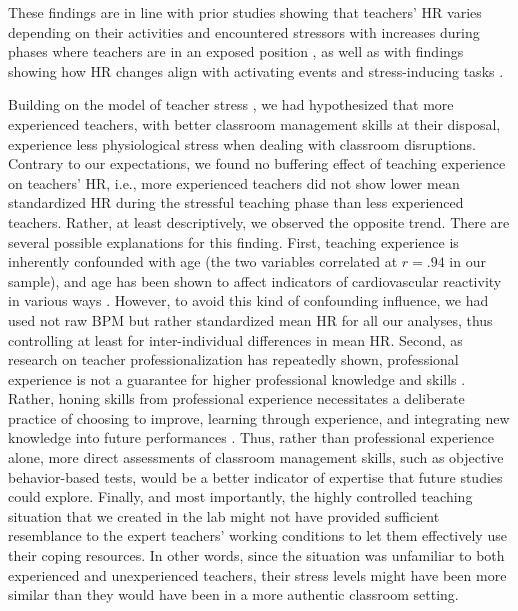 \documentclass[preprint, 3p,
authoryear]{elsarticle} %
\begin{document}
These findings are in line with prior studies showing that teachers' HR
varies depending on their activities and encountered stressors with
increases during phases where teachers are in an exposed position
\citep{sperka1995, scheuch1997psychophysische, donker2018, junker2021},
as well as with findings showing how HR changes align with activating
events and stress-inducing tasks \citep{Darnell2019, chalmers2021}.

Building on the model of teacher stress \citep[see Fig.
2]{kyriacou1978}, we had hypothesized that more experienced teachers,
with better classroom management skills at their disposal, experience
less physiological stress when dealing with classroom disruptions.
Contrary to our expectations, we found no buffering effect of teaching
experience on teachers' HR, i.e., more experienced teachers did not show
lower mean standardized HR during the stressful teaching phase than less
experienced teachers. Rather, at least descriptively, we observed the
opposite trend. There are several possible explanations for this
finding. First, teaching experience is inherently confounded with age
(the two variables correlated at \(r = .94\) in our sample), and age has
been shown to affect indicators of cardiovascular reactivity in various
ways \citep{uchino2010older}. However, to avoid this kind of confounding
influence, we had used not raw BPM but rather standardized mean HR for
all our analyses, thus controlling at least for inter-individual
differences in mean HR. Second, as research on teacher
professionalization has repeatedly shown, professional experience is not
a guarantee for higher professional knowledge and skills
\citep{kirschner2016professionswissen}. Rather, honing skills from
professional experience necessitates a deliberate practice of choosing
to improve, learning through experience, and integrating new knowledge
into future performances \citep{dunn1999deliberate}. Thus, rather than
professional experience alone, more direct assessments of classroom
management skills, such as objective behavior-based tests, would be a
better indicator of expertise that future studies could explore.
Finally, and most importantly, the highly controlled teaching situation
that we created in the lab might not have provided sufficient
resemblance to the expert teachers' working conditions to let them
effectively use their coping resources. In other words, since the
situation was unfamiliar to both experienced and unexperienced teachers,
their stress levels might have been more similar than they would have
been in a more authentic classroom setting.
\end{document}
